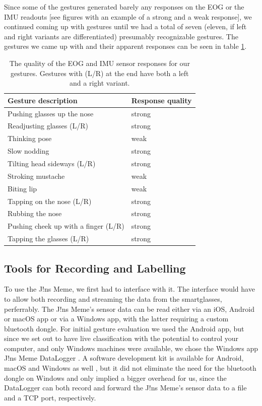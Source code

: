 \documentclass[runningheads]{llncs}
\begin{document}
Since some of the gestures generated barely any responses on the EOG or the IMU readouts
[see figures with an example of a strong and a weak response],
we continued coming up with gestures until we had a total of seven (eleven, if left and
right variants are differentiated) presumably recognizable gestures.
The gestures we came up with and their apparent responses can be seen in table
\ref{tab:responses}.

\begin{table}
\centering
\caption{The quality of the EOG and IMU sensor responses for our gestures. Gestures 
        with (L/R) at the end have both a left and a right variant.}\label{tab:responses}
\begin{tabular}{|l|l|}
    \hline
    Gesture description & Response quality\\
    \hline
    Pushing glasses up the nose & strong\\
    Readjusting glasses (L/R) & strong\\
    Thinking pose & weak\\
    Slow nodding & strong\\
    Tilting head sideways (L/R) & strong\\
    Stroking mustache & weak\\
    Biting lip & weak\\
    Tapping on the nose (L/R)& strong\\
    Rubbing the nose & strong\\
    Pushing cheek up with a finger (L/R) & strong\\
    Tapping the glasses (L/R) & strong\\\hline
\end{tabular}
\end{table}

\subsection{Tools for Recording and Labelling}
To use the J!ns Meme, we first had to interface with it. The interface would have to allow
both recording and streaming the data from the smartglasses, perferrably.
The J!ns Meme's sensor data can be read either via an iOS, Android or macOS app
or via a Windows app, with the latter requiring a custom bluetooth dongle. For
initial gesture evaluation we used the Android app, but since we set out to have
live classification with the potential to control your computer, and only Windows
machines were available, we chose the Windows app J!ns Meme DataLogger
\cite{jinsMemeDataLoggerWin}. A software development kit is available for Android, macOS
and Windows as well \cite{jinsMemeSDK}, but it did not eliminate the
need for the bluetooth dongle on Windows and only implied a bigger overhead for us,
since the DataLogger can both record and forward the J!ns Meme's sensor data to a
file and a TCP port, respectively.
\end{document}
